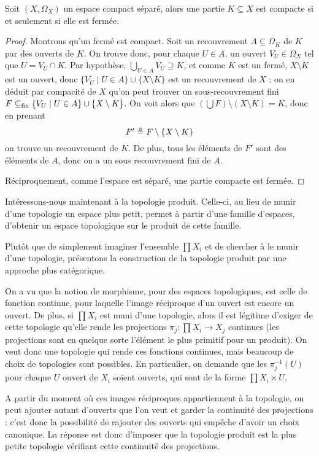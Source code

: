 \begin{proposition}
  Soit $(X,\Omega_X)$ un espace compact séparé, alors une partie $K\subseteq X$
  est compacte si et seulement si elle est fermée.
\end{proposition}

\begin{proof}
  Montrons qu'un fermé est compact. Soit un recouvrement
  $A\subseteq\Omega_K$ de $K$ par des ouverts de $K$. On trouve donc, pour
  chaque $U\in A$, un ouvert $V_U\in\Omega_X$ tel que $U = V_U\cap K$. Par
  hypothèse, $\displaystyle\bigcup_{U \in A} V_U \supseteq K$, et comme
  $K$ est un fermé, $X\setminus K$ est un ouvert, donc
  $\{V_U\mid U \in A\}\cup\{X\setminus K\}$ est un recouvrement de $X$ :
  on en déduit par compacité de $X$ qu'on peut trouver un sous-recouvrement
  fini $F\subseteq_{\mathrm{fin}} \{V_U\mid U \in A\}\cup\{X\setminus K\}$. On voit alors que
  $(\bigcup F)\setminus (X\setminus K)= K$, donc en prenant
  \[F' \triangleq F\setminus\{X\setminus K\}\]
  on trouve un recouvrement de $K$. De plus, tous les éléments de $F'$ sont
  des éléments de $A$, donc on a un sous recouvrement fini de $A$.

  Réciproquement, comme l'espace est séparé, une partie compacte est fermée.
\end{proof}

Intéressons-nous maintenant à la topologie produit. Celle-ci, au lieu de
munir d'une topologie un espace plus petit, permet à partir d'une famille
d'espaces, d'obtenir un espace topologique sur le produit de cette famille.

Plutôt que de simplement imaginer l'ensemble $\prod X_i$ et de chercher à le
munir d'une topologie, présentons la construction de la topologie produit par
une approche plus catégorique.

On a vu que la notion de morphisme, pour des espaces topologiques, est celle de
fonction continue, pour laquelle l'image réciproque d'un ouvert est encore un
ouvert. De plus, si $\prod X_i$ est muni d'une topologie, alors il est légitime
d'exiger de cette topologie qu'elle rende les projections
$\pi_j : \prod X_i \to X_j$ continues (les projections sont en quelque sorte
l'élément le plus primitif pour un produit). On veut donc une topologie qui
rende ces fonctions continues, mais beaucoup de choix de topologies sont
possibles. En particulier, on demande que les $\pi_j^{-1}(U)$ pour chaque
$U$ ouvert de $X_i$ soient ouverts, qui sont de la forme $\prod X_i \times U$.

A partir du moment où ces images réciproques appartiennent à la topologie, on
peut ajouter autant d'ouverts que l'on veut et garder la continuité des
projections : c'est donc la possibilité de rajouter des ouverts qui empêche
d'avoir un choix canonique. La réponse est donc d'imposer que la topologie
produit est la plus petite topologie vérifiant cette continuité des projections.


